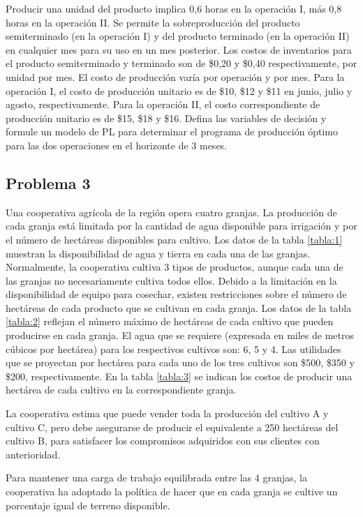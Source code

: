\documentclass[letterpaper]{article}
\begin{document}


Producir una unidad del producto implica 0,6 horas en la operación I, más 0,8 horas en la operación II. Se permite la sobreproducción del producto semiterminado (en la operación I) y del producto terminado (en la operación II) en cualquier mes para su uso en un mes posterior. Los costos de inventarios para el producto semiterminado y terminado son de \$0,20 y \$0,40 respectivamente, por unidad por mes. El costo de producción varía por operación y por mes. Para la operación I, el costo de producción unitario es de \$10, \$12 y \$11 en junio, julio y agosto, respectivamente. Para la operación II, el costo correspondiente de producción unitario es de \$15, \$18 y \$16. Defina las variables de decisión y formule un modelo de PL para determinar el programa de producción óptimo para las dos operaciones en el horizonte de 3 meses.

\subsection*{Problema 3}
Una cooperativa agrícola de la región opera cuatro granjas. La producción de cada granja está limitada por la cantidad de agua disponible para irrigación y por el número de hectáreas disponibles para cultivo. Los datos de la tabla \ref{tabla:1} muestran la disponibilidad de agua y tierra en cada una de las granjas. Normalmente, la cooperativa cultiva 3 tipos de productos, aunque cada una de las granjas no necesariamente cultiva todos ellos. Debido a la limitación en la disponibilidad de equipo para cosechar, existen restricciones sobre el número de hectáreas de cada producto que se cultivan en cada granja. Los datos de la tabla \ref{tabla:2} reflejan el número máximo de hectáreas de cada cultivo que pueden producirse en cada granja. El agua que se requiere (expresada en miles de metros cúbicos por hectárea) para los respectivos cultivos son: 6, 5 y 4. Las utilidades que se proyectan por hectárea para cada uno de los tres cultivos son \$500, \$350 y \$200, respectivamente. En la tabla \ref{tabla:3} se indican los costos de producir una hectárea de cada cultivo en la correspondiente granja.

La cooperativa estima que puede vender toda la producción del cultivo A y cultivo C, pero debe asegurarse de producir el equivalente a 250 hectáreas del cultivo B, para satisfacer los compromisos adquiridos con sus clientes con anterioridad.

Para mantener una carga de trabajo equilibrada entre las 4 granjas, la cooperativa ha adoptado la política de hacer que en cada granja se cultive un porcentaje igual de terreno disponible. 



\end{document}
